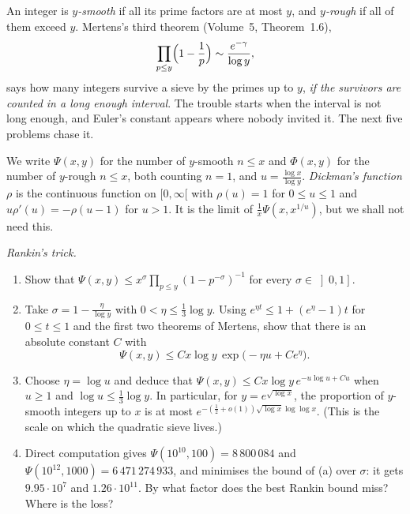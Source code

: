 An integer is \emph{$y$-smooth} if all its prime factors are at most $y$, and \emph{$y$-rough} if all of them exceed $y$. Mertens's third theorem (Volume~5, Theorem~1.6),
\[
\prod_{p\le y}\Bigl(1-\frac1p\Bigr)\sim\frac{e^{-\gamma}}{\log y},
\]
says how many integers survive a sieve by the primes up to $y$, \emph{if the survivors are counted in a long enough interval}. The trouble starts when the interval is
not long enough, and Euler's constant appears where nobody invited it. The next five problems chase it.

We write $\Psi(x,y)$ for the number of $y$-smooth $n\le x$ and $\Phi(x,y)$ for the number of $y$-rough $n\le x$, both counting $n=1$, and $u=\frac{\log x}{\log y}$.
\emph{Dickman's function} $\rho$ is the continuous function on $[0,\infty[$ with $\rho(u)=1$ for $0\le u\le1$ and $u\rho'(u)=-\rho(u-1)$ for $u>1$. It is the limit of
$\frac1x\Psi(x,x^{1/u})$, but we shall not need this.

\begin{exercise}[$\star\star$]\label{pb:rankin}
\emph{Rankin's trick.}
\begin{enumerate}[label=(\alph*)]
\item Show that $\Psi(x,y)\le x^\sigma\prod_{p\le y}(1-p^{-\sigma})^{-1}$ for every $\sigma\in\left]0,1\right]$.
\item Take $\sigma=1-\frac\eta{\log y}$ with $0<\eta\le\frac13\log y$. Using $e^{\eta t}\le1+(e^\eta-1)t$ for $0\le t\le1$ and the first two theorems of Mertens, show that
there is an absolute constant $C$ with
\[
\Psi(x,y)\le Cx\log y\,\exp\bigl(-\eta u+Ce^\eta\bigr).
\]
\item Choose $\eta=\log u$ and deduce that $\Psi(x,y)\le Cx\log y\,e^{-u\log u+Cu}$ when $u\ge1$ and $\log u\le\frac13\log y$. In particular, for $y=e^{\sqrt{\log x}}$,
the proportion of $y$-smooth integers up to $x$ is at most $e^{-(\frac12+o(1))\sqrt{\log x}\log\log x}$. (This is the scale on which the quadratic sieve lives.)
\item Direct computation gives $\Psi(10^{10},100)=8\,800\,084$ and $\Psi(10^{12},1000)=6\,471\,274\,933$, and minimises the bound of (a) over $\sigma$: it gets
$9.95\cdot10^7$ and $1.26\cdot10^{11}$. By what factor does the best Rankin bound miss? Where is the loss?
\end{enumerate}
\end{exercise}

